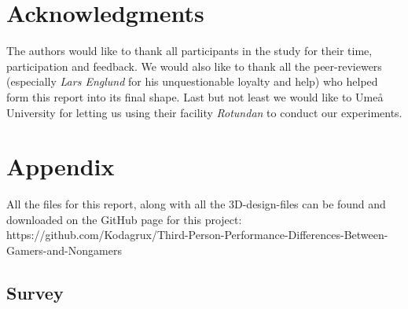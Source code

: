 \documentclass[runningheads,a4paper,oribibl]{llncs}
\begin{document}

\section{Acknowledgments}
The authors would like to thank all participants in the study for their time, participation and feedback. We would also like to thank all the peer-reviewers (especially \emph{Lars Englund} for his unquestionable loyalty and help) who helped form this report into its final shape. Last but not least we would like to Umeå University for letting us using their facility \emph{Rotundan} to conduct our experiments.








%



\newpage
\appendix

\section{Appendix}
All the files for this report, along with all the 3D-design-files can be found and downloaded on the GitHub page for this project: https://github.com/Kodagrux/Third-Person-Performance-Differences-Between-Gamers-and-Nongamers 
\subsection{Survey} \label{subsec:Survey}

\end{document}
